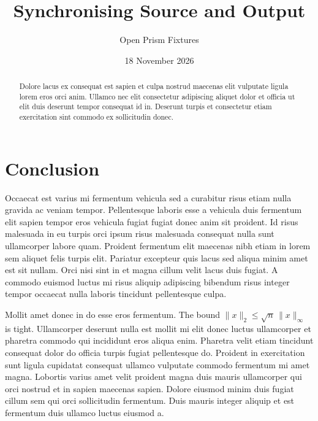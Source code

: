 \documentclass[11pt,a4paper]{article}
\title{Synchronising Source and Output}
\author{Open Prism Fixtures}
\date{18 November 2026}
\begin{document}
\maketitle

\begin{abstract}
Dolore lacus ex consequat est sapien et culpa nostrud maecenas elit
vulputate ligula lorem eros orci anim. Ullamco nec elit consectetur
adipiscing aliquet dolor et officia ut elit duis deserunt tempor
consequat id in. Deserunt turpis et consectetur etiam exercitation sint
commodo ex sollicitudin donec.
\end{abstract}





\section{Conclusion}
Occaecat est varius mi fermentum vehicula sed a curabitur risus etiam
nulla gravida ac veniam tempor. Pellentesque laboris esse a vehicula
duis fermentum elit sapien tempor eros vehicula fugiat fugiat donec anim
sit proident. Id risus malesuada in eu turpis orci ipsum risus malesuada
consequat nulla sunt ullamcorper labore quam. Proident fermentum elit
maecenas nibh etiam in lorem sem aliquet felis turpis elit. Pariatur
excepteur quis lacus sed aliqua minim amet est sit nullam. Orci nisi
sint in et magna cillum velit lacus duis fugiat. A commodo euismod
luctus mi risus aliquip adipiscing bibendum risus integer tempor
occaecat nulla laboris tincidunt pellentesque culpa.

Mollit amet donec in do esse eros fermentum. The bound $\|x\|_2 \le
\sqrt{n}\,\|x\|_\infty$ is tight. Ullamcorper deserunt nulla est mollit
mi elit donec luctus ullamcorper et pharetra commodo qui incididunt eros
aliqua enim. Pharetra velit etiam tincidunt consequat dolor do officia
turpis fugiat pellentesque do. Proident in exercitation sunt ligula
cupidatat consequat ullamco vulputate commodo fermentum mi amet magna.
Lobortis varius amet velit proident magna duis mauris ullamcorper qui
orci nostrud et in sapien maecenas sapien. Dolore eiusmod minim duis
fugiat cillum sem qui orci sollicitudin fermentum. Duis mauris integer
aliquip et est fermentum duis ullamco luctus eiusmod a.
\end{document}
